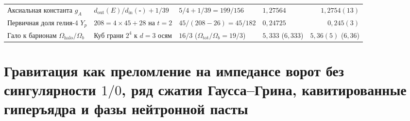 \begin{table}[htbp]
{\begin{tabular}{@{}llllr@{}}
Аксиальная константа $g_A$ & $d_{\mathrm{out}}(E)/d_{\mathrm{in}}(\square) + 1/39$ & $5/4 + 1/39 = 199/156$ & $1{,}27564$ & $1{,}2754(13)$ \\
Первичная доля гелия-4 $Y_p$ & $208 = 4\times 45 + 28$ на $t=2$ & $45 / (208 - 26) = 45/182$ & $0{,}24725$ & $0{,}245(3)$ \\
Гало к барионам $\Omega_{\mathrm{halo}}/\Omega_b$ & Куб грани $2^4$ к $d=3$ осям & $16 / 3$ ($\Omega_{\mathrm{tot}}/\Omega_b = 19/3$) & $5{,}333$ ($6{,}333$) & $5{,}36(5)$ ($6{,}36$) \\
\bottomrule
\end{tabular}%
}
\end{table}

\section{Гравитация как преломление на импедансе ворот без сингулярности \texorpdfstring{$1/0$}{1/0}, ряд сжатия Гаусса--Грина, кавитированные гиперъядра и фазы нейтронной пасты}

